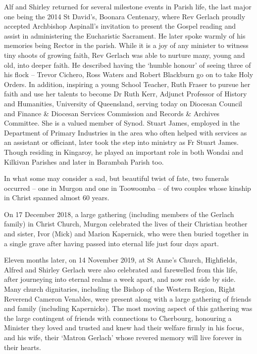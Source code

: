 Alf and Shirley returned for several milestone events in Parish life, the last major one being the 2014 St David's, Boonara Centenary, where Rev Gerlach proudly accepted Archbishop Aspinall's invitation to present the Gospel reading and assist in administering the Eucharistic Sacrament. He later spoke warmly of his memories being Rector in the parish. While it is a joy of any minister to witness tiny shoots of growing faith, Rev Gerlach was able to nurture many, young and old, into deeper faith. He described having the `humble honour' of seeing three of his flock -- Trevor Cichero, Ross Waters and Robert Blackburn go on to take Holy Orders. In addition, inspiring a young School Teacher, Ruth Fraser to pursue her faith and use her talents to become Dr Ruth Kerr, Adjunct Professor of History and Humanities, University of Queensland, serving today on Diocesan Council and Finance \& Diocesan Services Commission and Records \& Archives Committee. She is a valued member of Synod. Stuart James, employed in the Department of Primary Industries in the area who often helped with services as an assistant or officiant, later took the step into ministry as Fr Stuart James. Though residing in Kingaroy, he played an important role in both Wondai and Kilkivan Parishes and later in Barambah Parish too.



In what some may consider a sad, but beautiful twist of fate, two funerals occurred -- one in Murgon and one in Toowoomba -- of two couples whose kinship in Christ spanned almost 60 years.



On 17 December 2018, a large gathering (including members of the Gerlach family) in Christ Church, Murgon celebrated the lives of their Christian brother and sister, Ivor (Mick) and Marion Kapernick, who were then buried together in a single grave after having passed into eternal life just four days apart.



Eleven months later, on 14 November 2019, at St Anne's Church, Highfields, Alfred and Shirley Gerlach were also celebrated and farewelled from this life, after journeying into eternal realms a week apart, and now rest side by side. Many church dignitaries, including the Bishop of the Western Region, Right Reverend Cameron Venables, were present along with a large gathering of friends and family (including Kapernicks). The most moving aspect of this gathering was the large contingent of friends with connections to Cherbourg, honouring a Minister they loved and trusted and knew had their welfare firmly in his focus, and his wife, their `Matron Gerlach' whose revered memory will live forever in their hearts.



